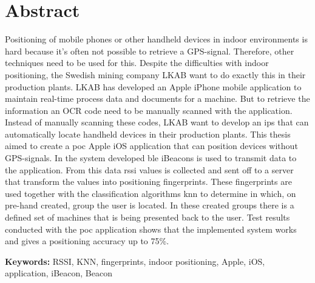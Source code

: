 \newpage
\chapter*{Abstract}
Positioning of mobile phones or other handheld devices in indoor environments is hard because it's often not possible to retrieve a GPS-signal.
Therefore, other techniques need to be used for this.
Despite the difficulties with indoor positioning, the Swedish mining company LKAB want to do exactly this in  their production plants.
LKAB has developed an Apple iPhone mobile application to maintain real-time process data and documents for a machine.
But to retrieve the information an OCR code need to be manually scanned with the application.
Instead of manually scanning these codes, LKAB want to develop an \acrlong{ips} that can automatically locate handheld devices in their production plants.
This thesis aimed to create a \acrfull{poc} Apple iOS application that can position devices without GPS-signals.
In the system developed \acrlong{ble} iBeacons is used to transmit data to the application.
From this data \acrlong{rssi} values is  collected and sent off to a server that transform the values into positioning fingerprints.
These fingerprints are used together with the classification algorithms \acrlong{knn} to determine in which, on pre-hand created, group the user is located.
In these created groups there is a defined set of machines that is being presented back to the user.
Test results conducted with the \acrshort{poc} application shows that the implemented system works and gives a positioning accuracy up to 75\%.


\bigskip

\textbf{Keywords:} RSSI, KNN, fingerprints, indoor positioning, Apple, iOS, application, iBeacon, Beacon
